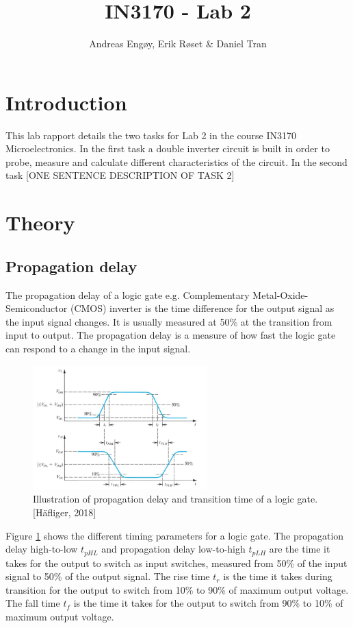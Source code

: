 \documentclass[onecolumn]{article}
\title{IN3170 - Lab 2}
\author{Andreas Engøy, Erik Røset \& Daniel Tran}
\date{\monthname[\the\month] \the\year}
\begin{document}
\maketitle

\section{Introduction}
This lab rapport details the two tasks for Lab 2 in the course IN3170 Microelectronics. In the first task a double inverter circuit is built in order to probe, measure and calculate different characteristics of the circuit. In the second task [ONE SENTENCE DESCRIPTION OF TASK 2]

\section{Theory}
\subsection{Propagation delay}
The propagation delay of a logic gate e.g. Complementary Metal-Oxide-Semiconductor (CMOS) inverter is the time difference for the output signal as the input signal changes. It is usually measured at 50\% at the transition from input to output. The propagation delay is a measure of how fast the logic gate can respond to a change in the input signal.

\begin{figure}[h!]
    \centering
    \includegraphics[width=0.6\textwidth]{tphl.png}
    \caption{Illustration of propagation delay and transition time of a logic gate. [Häfliger, 2018]}
    \label{fig:tphl}
\end{figure}

Figure \ref{fig:tphl} shows the different timing parameters for a logic gate. The propagation delay high-to-low $t_{pHL}$ and propagation delay low-to-high $t_{pLH}$ are the time it takes for the output to switch as input switches, measured from 50\% of the input signal to 50\% of the output signal. The rise time $t_{r}$ is the time it takes during transition for the output to switch from 10\% to 90\% of maximum output voltage. The fall time $t_{f}$ is the time it takes for the output to switch from 90\% to 10\% of maximum output voltage.
\end{document}
